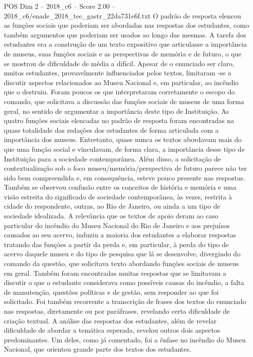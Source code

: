 \begin{textsample}{POS Dim 2 – 2018\_c6 – Score 2.00 – 2018\_c6/enade\_2018\_tec\_gastr\_22da731e6f.txt}
O padrão de resposta elencou as funções sociais que poderiam ser abordadas nas respostas dos estudantes, como também argumentos que poderiam ser usados ao longo das mesmas.
A tarefa dos estudantes era a construção de um texto expositivo que articulasse a importância de museus, suas funções sociais e as perspectivas de memória e de futuro, o que se mostrou de dificuldade de média a difícil.
Apesar de o enunciado ser claro, muitos estudantes, provavelmente influenciados pelos textos, limitaram -se a discutir aspectos relacionados ao Museu Nacional e, em particular, ao incêndio que o destruiu.
Foram poucos os que interpretaram corretamente o escopo do comando, que solicitava a discussão das funções sociais de museus de uma forma geral, no sentido de argumentar a importância deste tipo de Instituição.
As quatro funções sociais elencadas no padrão de resposta foram encontradas na quase totalidade das redações dos estudantes de forma articulada com a importância dos museus.
Entretanto, quase nunca os textos abordavam mais do que uma função social e vinculavam, de forma clara, a importância desse tipo de Instituição para a sociedade contemporânea.
Além disso, a solicitação de contextualização sob o foco museu/memória/perspectiva de futuro parece não ter sido bem compreendida e, em consequência, esteve pouco presente nas respostas.
Também se observou confusão entre os conceitos de história e memória e uma visão estreita do significado de sociedade contemporânea, às vezes, restrita à cidade do respondente, outras, ao Rio de Janeiro, ou ainda a um tipo de sociedade idealizada.
A relevância que os textos de apoio deram ao caso particular do incêndio do Museu Nacional do Rio de Janeiro e aos prejuízos causados ao seu acervo, induziu a maioria dos estudantes a elaborar respostas tratando das funções a partir da perda e, em particular, à perda do tipo de acervo daquele museu e do tipo de pesquisa que lá se desenvolve, divergindo do comando da questão, que solicitava texto abordando funções sociais de museus em geral.
Também foram encontradas muitas respostas que se limitavam a discutir o que o estudante considerava como possíveis causas do incêndio, a falta de manutenção, questões políticas e de gestão, sem responder ao que foi solicitado.
Foi também recorrente a transcrição de frases dos textos do enunciado nas respostas, diretamente ou por paráfrases, revelando certa dificuldade de criação textual.
A análise das respostas dos estudantes, além de revelar dificuldade de abordar a temática esperada, revelou outros dois aspectos predominantes.
Um deles, como já comentado, foi a ênfase no incêndio do Museu Nacional, que orientou grande parte dos textos dos estudantes.

\end{textsample}
